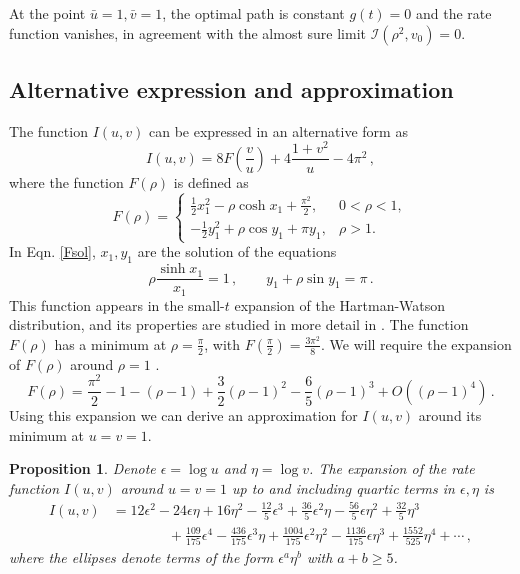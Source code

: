 \documentclass[11pt]{article}
\numberwithin{equation}{section}
\theoremstyle{plain}
\newtheorem{proposition}[theorem]{Proposition}
\begin{document}
At the point $\bar u = 1, \bar v=1$, the optimal 
path is constant $g(t)=0$ and the rate function vanishes, in agreement with
the almost sure limit
$\mathcal{I}(\rho^2,v_0) =  0$.

\subsection{Alternative expression and approximation}

The function $I(u,v)$ can be expressed in an alternative form as
\begin{equation}\label{FHW}
I(u,v) = 8 F\left(\frac{v}{u}\right) + 4 \frac{1+v^2}{u} - 4\pi^2\,,
\end{equation}
where the function $F(\rho)$ is defined as
\begin{equation}\label{Fsol}
F(\rho) = \begin{cases}
 \frac12 x_1^2- \rho \cosh x_1 + \frac{\pi^2}{2}, &  0 < \rho < 1, \\
-\frac12 y_1^2+ \rho \cos y_1 + \pi y_1, & \rho > 1.
\end{cases}
\end{equation}
In Eqn. \eqref{Fsol}, $x_1, y_1$ are the solution of the equations
\begin{equation}
\rho \frac{\sinh x_1}{x_1} = 1\,,
\qquad
y_1 + \rho\sin y_1 = \pi\,.
\end{equation}
This function appears in the small-$t$ expansion of the Hartman-Watson 
distribution, and its properties are studied in more detail in \cite{HWexp}.
The function $F(\rho)$ has a minimum at $\rho=\frac{\pi}{2}$, with
$F(\frac{\pi}{2})=\frac{3\pi^2}{8}$. 
We will require the expansion of $F(\rho)$ around $\rho=1$ \cite{HWexp}.
\begin{equation}\label{Fexp}
F(\rho) = \frac{\pi^2}{2}-1 - (\rho-1) + \frac32 (\rho-1)^2
- \frac65 (\rho-1)^3 + O((\rho-1)^4)\,.
\end{equation}
Using this expansion we can derive an approximation for $I(u,v)$ around
its minimum at $u=v=1$.

\begin{proposition}\label{prop:Iuvexp}
Denote $\epsilon = \log u$ and $\eta= \log v$. 
The expansion of the rate function $I(u,v)$ around $u=v=1$ up to and
including quartic terms in $\epsilon,\eta$ is
\begin{align}\label{Iquart}
I(u,v) &=12\epsilon^2 - 24 \epsilon\eta + 16 \eta^2 
- \frac{12}{5}  \epsilon^3 + \frac{36}{5} \epsilon^2 \eta -
\frac{56}{5} \epsilon \eta^2 + \frac{32}{5}\eta^3  \nonumber \\
& \qquad\qquad + \frac{109}{175}\epsilon^4 -
\frac{436}{175} \epsilon^3 \eta
+ \frac{1004}{175} \epsilon^2 \eta^2 - \frac{1136}{175} 
\epsilon \eta^3 + \frac{1552}{525}\eta^4 + \cdots\,, 
\end{align}
where the ellipses denote terms of the form $\epsilon^a \eta^b$ with $a+b\geq 5$.
\end{proposition}
\end{document}
